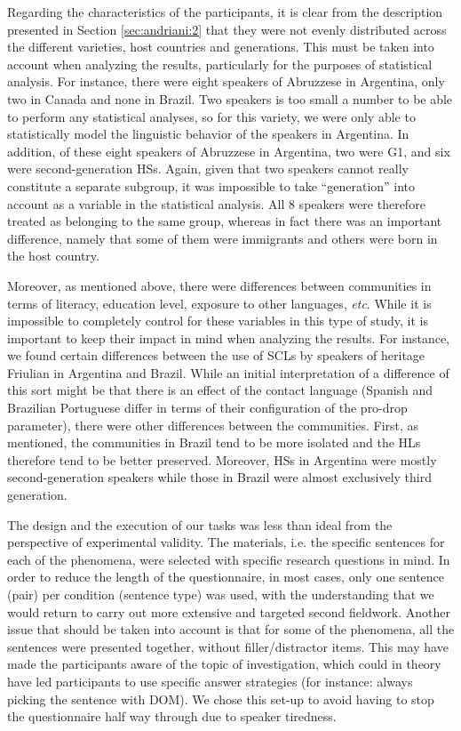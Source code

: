 \documentclass[output=paper,hidelinks]{langscibook}
\begin{document}
Regarding the characteristics of the participants, it is clear from the description presented in Section \ref{sec:andriani:2} that they were not evenly distributed across the different varieties, host countries and generations. This must be taken into account when analyzing the results, particularly for the purposes of statistical analysis. For instance, there were eight speakers of Abruzzese in Argentina, only two in Canada and none in Brazil. Two speakers is too small a number to be able to perform any statistical analyses, so for this variety, we were only able to statistically model the linguistic behavior of the speakers in Argentina. In addition, of these eight speakers of Abruzzese in Argentina, two were G1, and six were second-generation HSs. Again, given that two speakers cannot really constitute a separate subgroup, it was impossible to take ``generation'' into account as a variable in the statistical analysis. All 8 speakers were therefore treated as belonging to the same group, whereas in fact there was an important difference, namely that some of them were immigrants and others were born in the host country. 

Moreover, as mentioned above, there were differences between communities in terms of literacy, education level, exposure to other languages, \textit{etc}. While it is impossible to completely control for these variables in this type of study, it is important to keep their impact in mind when analyzing the results. For instance, we found certain differences between the use of SCLs by speakers of heritage Friulian in Argentina and Brazil. While an initial interpretation of a difference of this sort might be that there is an effect of the contact language (Spanish and Brazilian Portuguese differ in terms of their configuration of the pro-drop parameter), there were other differences between the communities. First, as mentioned, the communities in Brazil tend to be more isolated and the HLs therefore tend to be better preserved. Moreover, HSs in Argentina were mostly second-generation speakers while those in Brazil were almost exclusively third generation. 

The design and the execution of our tasks was less than ideal from the perspective of experimental validity. The materials, i.e. the specific sentences for each of the phenomena, were selected with specific research questions in mind. In order to reduce the length of the questionnaire, in most cases, only one sentence (pair) per condition (sentence type) was used, with the understanding that we would return to carry out more extensive and targeted second fieldwork. Another issue that should be taken into account is that for some of the phenomena, all the sentences were presented together, without filler/distractor items. This may have made the participants aware of the topic of investigation, which could in theory have led participants to use specific answer strategies (for instance: always picking the sentence with DOM). We chose this set-up to avoid having to stop the questionnaire half way through due to speaker tiredness.
	
\end{document}
